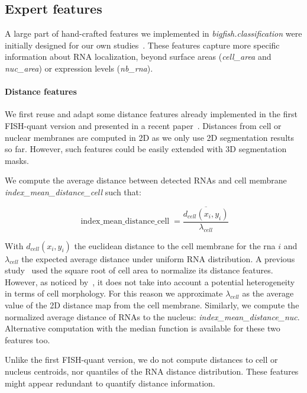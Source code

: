 \subsection{Expert features} \label{subsec:expert_features}

A large part of hand-crafted features we implemented in \emph{bigfish.classification} were initially designed for our own studies~\cite{CHOUAIB_2020,safieddine_choreography_2021,pichon_kinesin_2021}.
These features capture more specific information about \ac{RNA} localization, beyond surface areas (\emph{cell\_area} and \emph{nuc\_area}) or expression levels (\emph{nb\_rna}).

\paragraph{Distance features}

We first reuse and adapt some distance features already implemented in the first FISH-quant version and presented in a recent paper~\cite{samacoits_computational_2018}.
Distances from cell or nuclear membranes are computed in 2D as we only use 2D segmentation results so far.
However, such features could be easily extended with 3D segmentation masks.

We compute the average distance between detected \ac{RNA}s and cell membrane \emph{index\_mean\_distance\_cell} such that:

\begin{equation}
	{\displaystyle \operatorname{index\_mean\_distance\_cell} = \frac{\overline{d_{cell}(x_i, y_i)}}{\lambda_{cell}}}
\end{equation}

\noindent
With $d_{cell}(x_i, y_i)$ the euclidean distance to the cell membrane for the rna $i$ and $\lambda_{cell}$ the expected average distance under uniform \ac{RNA} distribution.
A previous study~\cite{battich_control_2015} used the square root of cell area to normalize its distance features.
However, as noticed by~\cite{samacoits_computational_2018}, it does not take into account a potential heterogeneity in terms of cell morphology.
For this reason we approximate $\lambda_{cell}$ as the average value of the 2D distance map from the cell membrane.
Similarly, we compute the normalized average distance of \ac{RNA}s to the nucleus: \emph{index\_mean\_distance\_nuc}.
Alternative computation with the median function is available for these two features too.

Unlike the first FISH-quant version, we do not compute distances to cell or nucleus centroids, nor quantiles of the \ac{RNA} distance distribution.
These features might appear redundant to quantify distance information.

